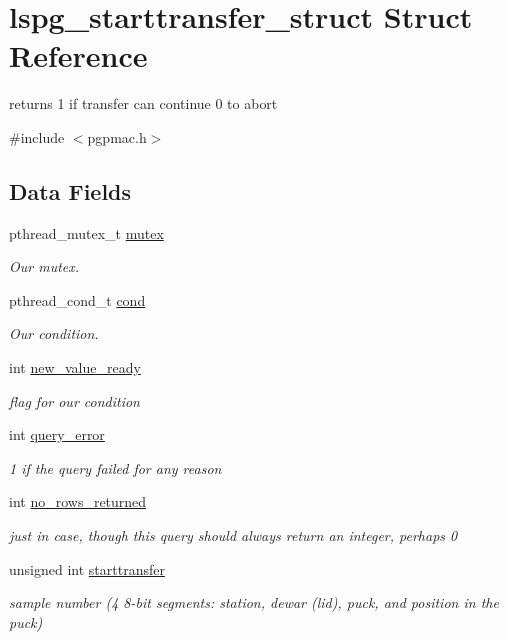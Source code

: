 \hypertarget{structlspg__starttransfer__struct}{\section{lspg\-\_\-starttransfer\-\_\-struct Struct Reference}
\label{structlspg__starttransfer__struct}
}


returns 1 if transfer can continue 0 to abort  




{\ttfamily \#include $<$pgpmac.\-h$>$}

\subsection*{Data Fields}
\begin{DoxyCompactItemize}
\item 
pthread\-\_\-mutex\-\_\-t \hyperlink{structlspg__starttransfer__struct_a47824bb2701a699d43a7a916e2010705}{mutex}
\begin{DoxyCompactList}\small\item\em Our mutex. \end{DoxyCompactList}\item 
pthread\-\_\-cond\-\_\-t \hyperlink{structlspg__starttransfer__struct_a1a569a2afabd7910219ff9d2d48c1b38}{cond}
\begin{DoxyCompactList}\small\item\em Our condition. \end{DoxyCompactList}\item 
int \hyperlink{structlspg__starttransfer__struct_ad3a6356e5ccce15c982ddecf9634999f}{new\-\_\-value\-\_\-ready}
\begin{DoxyCompactList}\small\item\em flag for our condition \end{DoxyCompactList}\item 
int \hyperlink{structlspg__starttransfer__struct_a5ef1d5a6708b3872761b86aef34d7aeb}{query\-\_\-error}
\begin{DoxyCompactList}\small\item\em 1 if the query failed for any reason \end{DoxyCompactList}\item 
int \hyperlink{structlspg__starttransfer__struct_aa384ccd326d9247317f77072b93f94ca}{no\-\_\-rows\-\_\-returned}
\begin{DoxyCompactList}\small\item\em just in case, though this query should always return an integer, perhaps 0 \end{DoxyCompactList}\item 
unsigned int \hyperlink{structlspg__starttransfer__struct_af01b6bac6db9830719aef63e552312eb}{starttransfer}
\begin{DoxyCompactList}\small\item\em sample number (4 8-\/bit segments\-: station, dewar (lid), puck, and position in the puck) \end{DoxyCompactList}\end{DoxyCompactItemize}


